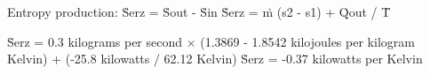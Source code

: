 Entropy production:  
Ṡerz = Ṡout - Ṡin  
Ṡerz = ṁ (s2 - s1) + Q̇out / T̄  

Ṡerz = 0.3 kilograms per second × (1.3869 - 1.8542 kilojoules per kilogram Kelvin) + (-25.8 kilowatts / 62.12 Kelvin)  
Ṡerz = -0.37 kilowatts per Kelvin